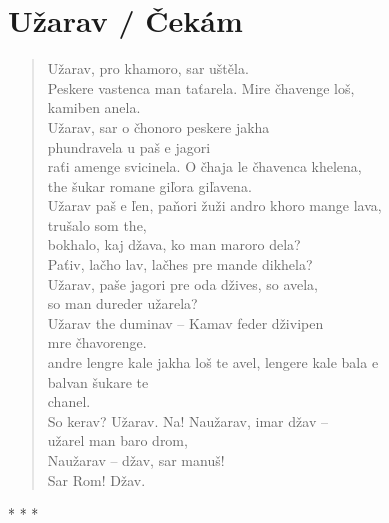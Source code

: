 
\section{Užarav / Čekám}

\begin{verse}
Užarav, pro khamoro, sar uštěla. \\
Peskere vastenca man taťarela. Mire čhavenge loš, \\
\hspace{\fill}kamiben anela. \\
Užarav, sar o čhonoro peskere jakha  \\
\hspace{\fill}phundravela u paš e jagori \\
raťi amenge svicinela. O čhaja le čhavenca khelena,  \\
\hspace{\fill}the šukar romane giľora giľavena. \\
Užarav paš e ľen, paňori žuži andro khoro mange lava, \\
\hspace{\fill}trušalo som the, \\
bokhalo, kaj džava, ko man maroro dela? \\
Paťiv, lačho lav, lačhes pre mande dikhela? \\
Užarav, paše jagori pre oda džives, so avela,  \\
\hspace{\fill}so man dureder užarela? \\
Užarav the duminav – Kamav feder dživipen  \\
\hspace{\fill}mre čhavorenge. \\
andre lengre kale jakha loš te avel, lengere kale bala e  \\
\hspace{\fill}balvan šukare te \\
chanel. \\
So kerav? Užarav. Na! Naužarav, imar džav –  \\
\hspace{\fill}užarel man baro drom, \\
Naužarav – džav, sar manuš! \\ 
Sar Rom! Džav.
\end{verse}

\begin{center}
* * *
\end{center}


